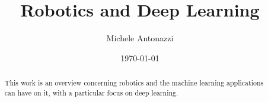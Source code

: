 \documentclass[letterpaper,12pt]{article}
\begin{document}
\title{Robotics and Deep Learning}
\author{Michele Antonazzi}
\date{\today}
\maketitle

\begin{abstract}
This work is an overview concerning robotics and the machine learning applications can have on it, with a particular focus on deep learning.  
\end{abstract}


\newpage


\newpage


\newpage


\newpage


\newpage


\newpage


\newpage


\newpage


\newpage


\newpage


\newpage
\end{document}

